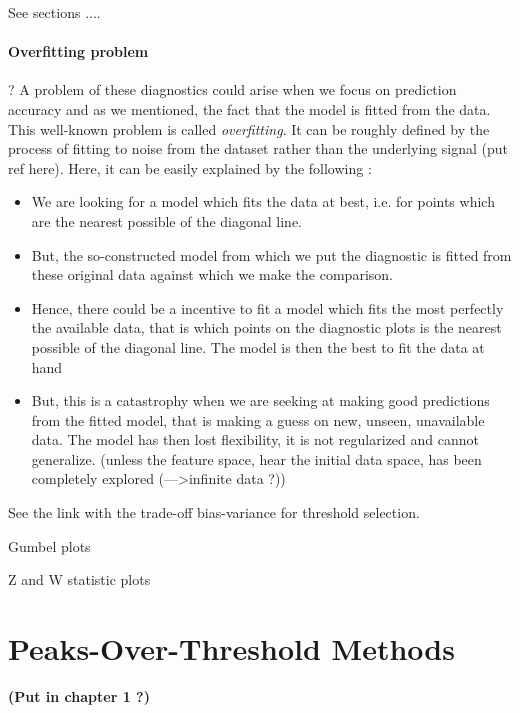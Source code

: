 \documentclass[11pt,a4paper,openany ]{book}
\begin{document}
See sections ....

\subsubsection*{Overfitting problem} \cite{northrop_cross_2016}?
A problem of these diagnostics could arise when we focus on prediction accuracy and as we mentioned, the fact that the model is fitted from the data. This well-known problem is called \emph{overfitting}. It can be roughly defined by the process of fitting to noise from the dataset rather than the underlying signal (put ref here). Here, it can be easily explained by the following :
\begin{itemize}
	
	\item We are looking for a model which fits the data at best, i.e. for points which are the nearest possible of the diagonal line.
	
	\item But, the so-constructed model from which we put the diagnostic is fitted from these original data against which we make the comparison.
	
	\item Hence, there could be a incentive to fit a model which fits the most perfectly the available data, that is which points on the diagnostic plots is the nearest possible of the diagonal line. The model is then the best to fit the data at hand
	
	\item But, this is a catastrophy when we are seeking at making good predictions from the fitted model, that is making a guess on new, unseen, unavailable data. The model has then lost flexibility, it is not regularized and cannot generalize. (unless the feature space, hear the initial data space, has been completely explored (--->infinite data ?))
\end{itemize}
See the link with the trade-off bias-variance for threshold selection.



Gumbel plots

Z and W statistic plots



\chapter{Peaks-Over-Threshold Methods}\label{sec::2}
\vspace{-1cm}
\minitoc \thispagestyle{empty}
 \vspace{1.5cm}
\textbf{(Put in chapter 1 ?)}
\end{document}
